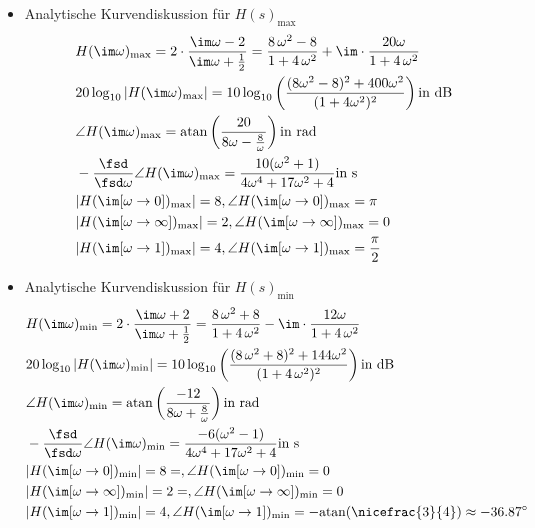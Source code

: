 \begin{itemize}
\item Analytische Kurvendiskussion für $H(s)_\mathrm{max}$
\begin{align}
&H(\im\omega)_\mathrm{max} = 2\cdot\frac{\im\omega-2}{\im\omega+\frac{1}{2}}=
\frac{8\,\omega^2 - 8}{1+4\,\omega^2}+
\im\cdot \frac{20\omega}{1+4\,\omega^2}\\
&20 \log_{10}|H(\im\omega)_\mathrm{max}| =
10 \log_{10} \left(\frac{(8 \omega^2 -8)^2 + 400 \omega^2}{(1+4\omega^2)^2}\right)\text{in dB}\\
&\angle H(\im\omega)_\mathrm{max} =
\mathrm{atan}\left(\frac{20}{8\omega-\frac{8}{\omega}}\right)\text{in rad}\\
&-\frac{\fsd}{\fsd \omega} \angle H(\im\omega)_\mathrm{max}=
\frac{10(\omega^2+1)}{4\omega^4+17\omega^2+4}\text{in s}\\
&|H(\im[\omega\to 0])_\mathrm{max}| = 8, \angle H(\im[\omega\to 0])_\mathrm{max} = \pi\\
&|H(\im[\omega\to\infty])_\mathrm{max}| = 2, \angle H(\im[\omega\to\infty])_\mathrm{max} = 0\\
&|H(\im[\omega\to 1])_\mathrm{max}| = 4, \angle H(\im[\omega\to 1])_\mathrm{max} = \frac{\pi}{2}
\end{align}

\item Analytische Kurvendiskussion für $H(s)_\mathrm{min}$
\begin{align}
&H(\im\omega)_\mathrm{min} = 2\cdot\frac{\im\omega+2}{\im\omega+\frac{1}{2}}=
\frac{8\,\omega^2 + 8}{1+4\,\omega^2}-
\im\cdot \frac{12\omega}{1+4\,\omega^2}
\\
&20 \log_{10}|H(\im\omega)_\mathrm{min}| =
10 \log_{10} \left(\frac{(8\,\omega^2 + 8)^2 + 144\omega^2}{(1+4\,\omega^2)^2}\right)\text{in dB}\\
&\angle H(\im\omega)_\mathrm{min} =
\mathrm{atan}\left(\frac{-12}{8\omega+\frac{8}{\omega}}\right)\text{in rad}\\
&-\frac{\fsd}{\fsd \omega} \angle H(\im\omega)_\mathrm{min}=
\frac{-6(\omega^2-1)}{4\omega^4+17\omega^2+4}\text{in s}\\
&|H(\im[\omega\to 0])_\mathrm{min}| = 8 = , \angle H(\im[\omega\to 0])_\mathrm{min} = 0\\
&|H(\im[\omega\to\infty])_\mathrm{min}| = 2 = , \angle H(\im[\omega\to\infty])_\mathrm{min} = 0\\
&|H(\im[\omega\to 1])_\mathrm{min}| = 4, \angle H(\im[\omega\to 1])_\mathrm{min} = -\mathrm{atan}(\nicefrac{3}{4}) \approx -36.87^\circ
\end{align}


\end{itemize}
